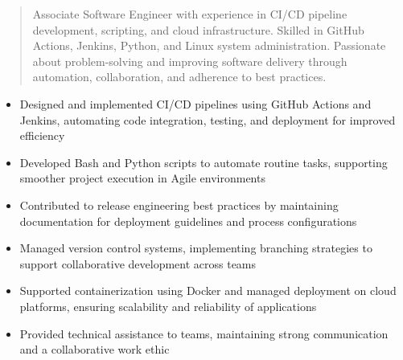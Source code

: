 



\makecvheader

\begin{quote}
  \noindent
  Associate Software Engineer with experience in CI/CD pipeline development, scripting, and cloud infrastructure. Skilled in GitHub Actions, Jenkins, Python, and Linux system administration. Passionate about problem-solving and improving software delivery through automation, collaboration, and adherence to best practices.
\end{quote}

\par\smallskip
\noindent
\begin{minipage}{20cm}
  \begin{minipage}{9.75cm}
    \begin{itemize}
      \item Designed and implemented CI/CD pipelines using GitHub Actions and Jenkins, automating code integration, testing, and deployment for improved efficiency
      \item Developed Bash and Python scripts to automate routine tasks, supporting smoother project execution in Agile environments
      \item Contributed to release engineering best practices by maintaining documentation for deployment guidelines and process configurations
    \end{itemize}
  \end{minipage}
  \hfill
  \begin{minipage}{9.75cm}
    \begin{itemize}
      \item Managed version control systems, implementing branching strategies to support collaborative development across teams
      \item Supported containerization using Docker and managed deployment on cloud platforms, ensuring scalability and reliability of applications
      \item Provided technical assistance to teams, maintaining strong communication and a collaborative work ethic
    \end{itemize}
  \end{minipage}
\end{minipage}
\par\smallskip
\divider

